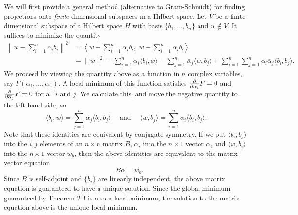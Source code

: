 \documentclass{homework}
\begin{document}
\begin{solution}
  We will first provide a general method (alternative to Gram-Schmidt) for finding projections onto \emph{finite} dimensional subspaces in a Hilbert space. Let $V$ be a finite dimensional subspace of a Hilbert space $H$ with basis $\{b_1,\dots,b_n\}$ and $w \not\in V$.  It suffices to minimize the quantity
  \begin{align*}
    \left\|w - \sum_{i=1}^n \alpha_i b_i \right\|^2 &= \left\langle w - \sum_{i=1}^n \alpha_i b_i,\,\,w - \sum_{i=1}^n \alpha_i b_i\right\rangle \\
    &=\|w\|^2 - \sum_{i=1}^n\alpha_i\langle b_i,w\rangle - \sum_{j=1}^n \bar \alpha_j\langle w,b_j\rangle + \sum_{i=1}^n\sum_{j=1}^n \alpha_i \bar \alpha_j \langle b_i, b_j\rangle.
  \end{align*}
  We proceed by viewing the quantity above as a function in $n$
  complex variables, say $F(\alpha_1,\dots,\alpha_n)$.  A local 
  minimum of this function satisfies
  $\frac{\partial}{\partial \alpha_i} F = 0$ and $\frac{\partial}{\partial \overline
  \alpha_j} F = 0$ for all $i$ and $j$.  We calculate this, and move the negative quantity to the left hand side, so
  $$
    \langle b_i, w\rangle = \sum_{j=1}^n \bar \alpha_j \langle b_i, b_j \rangle
    \quad \text{ and } \quad
    \langle w, b_j \rangle = \sum_{i=1}^n \alpha_i \langle b_i, b_j \rangle.
  $$
  Note that these identities are equivalent by conjugate symmetry.  If we put
  $\langle b_i, b_j\rangle$ into the $i,j$ elements of an $n\times n$ matrix
  $B$, $\alpha_i$ into the $n\times 1$ vector $\alpha$, and $\langle w,b_i\rangle$
  into the $n\times 1$ vector $w_b$, then the above identities are equivalent
  to the matrix-vector equation
  $$
    \quad B\alpha = w_b.
  $$
  Since $B$ is self-adjoint and $\{b_i\}$ are linearly independent, the above matrix equation is guaranteed to have a unique solution. Since the global minimum guaranteed by Theorem 2.3 is also a local minimum, the solution to the matrix equation above is the unique local minimum.


\end{solution}
\end{document}

